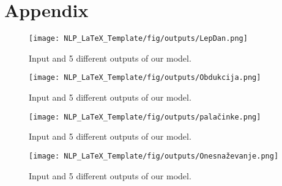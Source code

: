 \documentclass[fleqn,moreauthors,10pt]{ds_report}
\begin{document}
\section{Appendix}
\label{sec:appendix}

\begin{figure}[H]
    \centering
    \texttt{[image: NLP\_LaTeX\_Template/fig/outputs/LepDan.png]}
    \caption{Input and 5 different outputs of our model. }
    \label{fig:output1}
\end{figure}

\begin{figure}[H]
    \centering
    \texttt{[image: NLP\_LaTeX\_Template/fig/outputs/Obdukcija.png]}
    \caption{Input and 5 different outputs of our model. }
    \label{fig:output2}
\end{figure}


\begin{figure}[H]
    \centering
    \texttt{[image: NLP\_LaTeX\_Template/fig/outputs/palačinke.png]}
    \caption{Input and 5 different outputs of our model. }
    \label{fig:output3}
\end{figure}


\begin{figure}[H]
    \centering
    \texttt{[image: NLP\_LaTeX\_Template/fig/outputs/Onesnaževanje.png]}
    \caption{Input and 5 different outputs of our model. }
    \label{fig:output4}
\end{figure}







\end{document}

